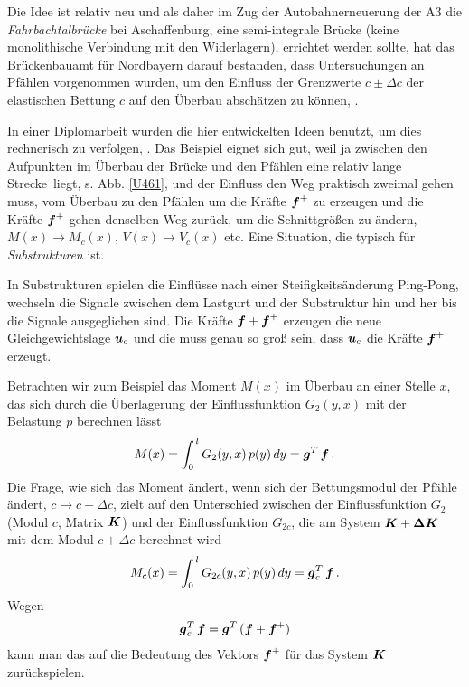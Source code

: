 {{Die Idee ist relativ neu und als daher im Zug der Autobahnerneuerung der A3 die {\em Fahrbachtalbr\"{u}cke\/} bei Aschaffenburg, eine semi-integrale Br\"{u}cke (keine monolithische Verbindung mit den Widerlagern), errichtet werden sollte, hat das Br\"{u}ckenbauamt f\"{u}r Nordbayern darauf bestanden, dass Untersuchungen an Pf\"{a}hlen vorgenommen wurden, um den Einfluss der Grenzwerte $c \pm \Delta c$ der elastischen Bettung $c$ auf den \"{U}berbau absch\"{a}tzen zu k\"{o}nnen, \cite{Schiefer}.

In einer Diplomarbeit wurden die hier entwickelten Ideen benutzt, um dies rechnerisch zu verfolgen, \cite{Sopoth}. Das Beispiel eignet sich gut, weil ja zwischen den Aufpunkten im \"{U}berbau der Br\"{u}cke und den Pf\"{a}hlen eine relativ lange \glq Strecke\grq\ liegt, s. Abb. \ref{U461}, und der Einfluss den Weg praktisch zweimal gehen muss, vom \"{U}berbau zu den Pf\"{a}hlen um die Kr\"{a}fte $\mbox{\boldmath $f$}^+$ zu erzeugen und die Kr\"{a}fte $\mbox{\boldmath $f$}^+$ gehen denselben Weg zur\"{u}ck, um die Schnittgr\"{o}{\ss}en zu \"{a}ndern, $M(x) \to M_c(x)$, $V(x) \to V_c(x)$ etc. Eine Situation, die typisch f\"{u}r {\em Substrukturen\/} ist.

In Substrukturen spielen die Einfl\"{u}sse nach einer Steifigkeits\"{a}nderung \glq Ping-Pong\grq, wechseln die Signale zwischen dem Lastgurt und der Substruktur hin und her bis die Signale ausgeglichen sind. Die Kr\"{a}fte $\mbox{\boldmath $f$} + \mbox{\boldmath $f$}^+$ erzeugen die neue Gleichgewichtslage $\mbox{\boldmath $u$}_c$ und die muss genau so gro{\ss} sein, dass $\mbox{\boldmath $u$}_c$ die Kr\"{a}fte $\mbox{\boldmath $f$}^+$ erzeugt.

Betrachten wir zum Beispiel das Moment $M(x)$ im \"{U}berbau an einer Stelle $x$, das sich durch die \"{U}berlagerung der Einflussfunktion $G_2(y,x)$ mit der Belastung $p$ berechnen l\"{a}sst
\begin{align}
M(x) = \int_0^{\,l} G_2(y,x)\,p(y)\,dy = \mbox{\boldmath $g$}^T\,\mbox{\boldmath $f$}\,.
\end{align}
Die Frage, wie sich das Moment \"{a}ndert, wenn sich der Bettungsmodul der Pf\"{a}hle \"{a}ndert, $c \to c + \Delta c$, zielt auf den Unterschied zwischen der Einflussfunktion $G_2$ (Modul $c$, Matrix $\mbox{\boldmath $K$}$) und der Einflussfunktion $G_{2 c}$, die am System $\mbox{\boldmath $K$} + \mbox{\boldmath $\Delta$} \mbox{\boldmath $K$}$ mit dem Modul $c + \Delta c$ berechnet wird
\begin{align}
M_c(x) = \int_0^{\,l} G_{2 c}(y,x)\,p(y)\,dy= \mbox{\boldmath $g$}_c^T\,\mbox{\boldmath $f$} \,.
\end{align}
Wegen
\begin{align}
\mbox{\boldmath $g$}_c^T\,\mbox{\boldmath $f$} = \mbox{\boldmath $g$}^T\,(\mbox{\boldmath $f$} + \mbox{\boldmath $f$}^+)
\end{align}
kann man das auf die Bedeutung des Vektors $\mbox{\boldmath $f$}^+$ f\"{u}r das System $\mbox{\boldmath $K$}$ zur\"{u}ckspielen.

}}
